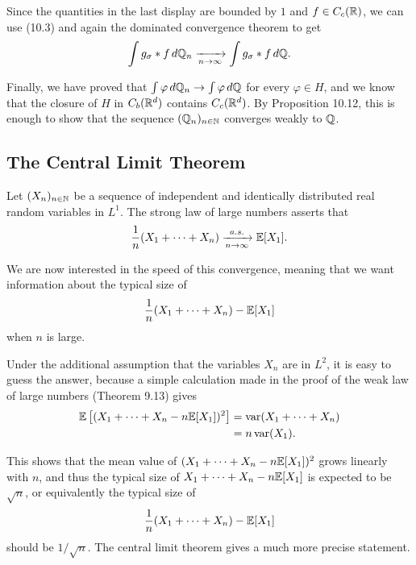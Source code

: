 \documentclass[../Main.tex]{subfiles}
\begin{document}
{Since the quantities in the last display are bounded by $1$ and $f\in C_c(\mathbb{R})$, we can use (10.3) and again the dominated convergence theorem to get
\[ \int g_\sigma * f\, d\mathbb{Q}_n \xrightarrow[n\to\infty]{} \int g_\sigma * f\, d\mathbb{Q} . \]

Finally, we have proved that $\int \varphi\, d\mathbb{Q}_n \to \int \varphi\, d\mathbb{Q}$ for every
$\varphi\in H$, and we know that the closure of $H$ in $C_b(\mathbb{R}^d)$ contains
$C_c(\mathbb{R}^d)$. By Proposition 10.12, this is enough to show that the sequence
$(\mathbb{Q}_n)_{n\in\mathbb{N}}$ converges weakly to $\mathbb{Q}$. 
}



\subsection{The Central Limit Theorem}
Let $(X_n)_{n \in \mathbb{N}}$ be a sequence of independent and identically distributed real random variables in $L^1$. The strong law of large numbers asserts that
\[ \frac{1}{n}(X_1 + \cdots + X_n) \xrightarrow[n \to \infty]{a.s.} \mathbb{E}[X_1]. \]

We are now interested in the speed of this convergence, meaning that we want information about the typical size of
\[
\frac{1}{n}(X_1 + \cdots + X_n) - \mathbb{E}[X_1]
\]
when $n$ is large.

Under the additional assumption that the variables $X_n$ are in $L^2$, it is easy to guess the answer, because a simple calculation made in the proof of the weak law of large numbers (Theorem 9.13) gives
\begin{align*}
\mathbb{E}\left[(X_1 + \cdots + X_n - n\mathbb{E}[X_1])^2\right]
&= \mathrm{var}(X_1 + \cdots + X_n) \\
&= n\,\mathrm{var}(X_1).
\end{align*}

This shows that the mean value of $(X_1 + \cdots + X_n - n\mathbb{E}[X_1])^2$ grows linearly with $n$, and thus the typical size of $X_1 + \cdots + X_n - n\mathbb{E}[X_1]$ is expected to be $\sqrt{n}$, or equivalently the typical size of
\[ \frac{1}{n}(X_1 + \cdots + X_n) - \mathbb{E}[X_1] \]
should be $1/\sqrt{n}$. The central limit theorem gives a much more precise statement.
\end{document}
